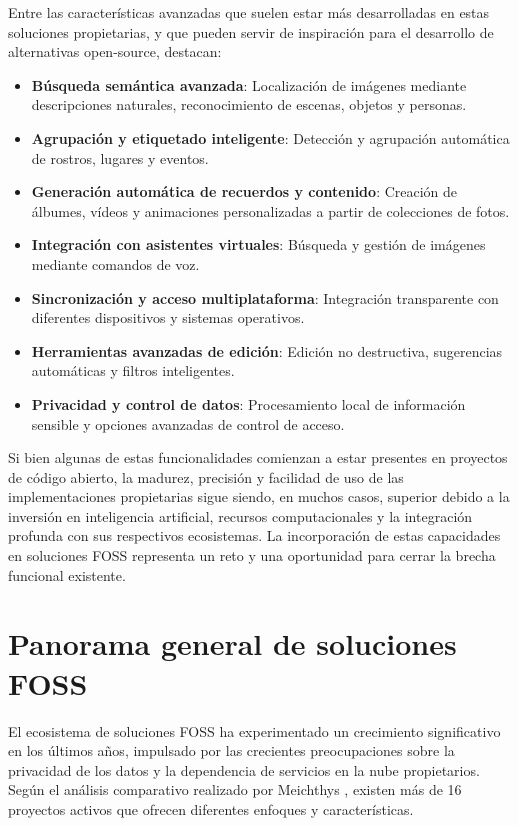 Entre las características avanzadas que suelen estar más desarrolladas en estas soluciones propietarias, y que pueden servir de inspiración para el desarrollo de alternativas open-source, destacan:
\begin{itemize}
    \item \textbf{Búsqueda semántica avanzada}: Localización de imágenes mediante descripciones naturales, reconocimiento de escenas, objetos y personas.
    \item \textbf{Agrupación y etiquetado inteligente}: Detección y agrupación automática de rostros, lugares y eventos.
    \item \textbf{Generación automática de recuerdos y contenido}: Creación de álbumes, vídeos y animaciones personalizadas a partir de colecciones de fotos.
    \item \textbf{Integración con asistentes virtuales}: Búsqueda y gestión de imágenes mediante comandos de voz.
    \item \textbf{Sincronización y acceso multiplataforma}: Integración transparente con diferentes dispositivos y sistemas operativos.
    \item \textbf{Herramientas avanzadas de edición}: Edición no destructiva, sugerencias automáticas y filtros inteligentes.
    \item \textbf{Privacidad y control de datos}: Procesamiento local de información sensible y opciones avanzadas de control de acceso.
\end{itemize}

Si bien algunas de estas funcionalidades comienzan a estar presentes en proyectos de código abierto, la madurez, precisión y facilidad de uso de las implementaciones propietarias sigue siendo, en muchos casos, superior debido a la inversión en inteligencia artificial, recursos computacionales y la integración profunda con sus respectivos ecosistemas. La incorporación de estas capacidades en soluciones FOSS representa un reto y una oportunidad para cerrar la brecha funcional existente.

\section{Panorama general de soluciones FOSS}

El ecosistema de soluciones FOSS ha experimentado un crecimiento significativo en los últimos años, impulsado por las crecientes preocupaciones sobre la privacidad de los datos y la dependencia de servicios en la nube propietarios. Según el análisis comparativo realizado por Meichthys \parencite{meichthys2024}, existen más de 16 proyectos activos que ofrecen diferentes enfoques y características.

